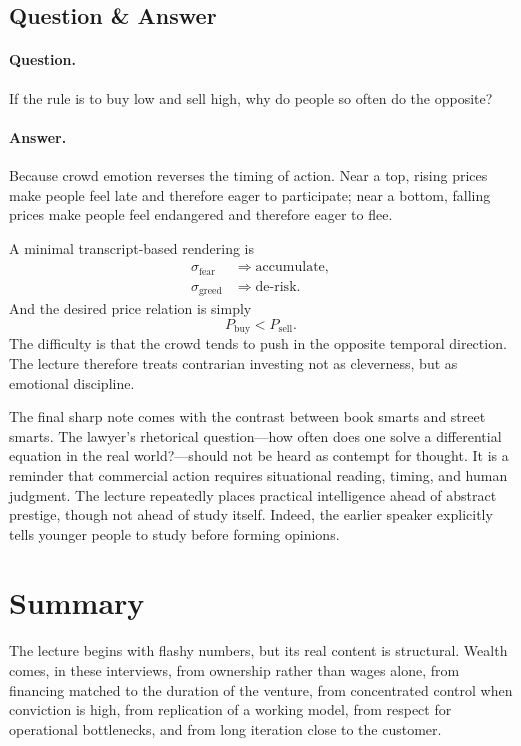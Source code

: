 \subsection{Question \& Answer}

\paragraph{Question.} If the rule is to buy low and sell high, why do people so often do the opposite?

\paragraph{Answer.} Because crowd emotion reverses the timing of action. Near a top, rising prices make people feel late and therefore eager to participate; near a bottom, falling prices make people feel endangered and therefore eager to flee.

A minimal transcript-based rendering is
\begin{align}
\sigma_{\mathrm{fear}} &\Rightarrow \text{accumulate},\\
\sigma_{\mathrm{greed}} &\Rightarrow \text{de-risk}.
\end{align}
And the desired price relation is simply
\begin{equation}
P_{\mathrm{buy}} < P_{\mathrm{sell}}.
\end{equation}
The difficulty is that the crowd tends to push in the opposite temporal direction. The lecture therefore treats contrarian investing not as cleverness, but as emotional discipline.

The final sharp note comes with the contrast between book smarts and street smarts. The lawyer's rhetorical question---how often does one solve a differential equation in the real world?---should not be heard as contempt for thought. It is a reminder that commercial action requires situational reading, timing, and human judgment. The lecture repeatedly places practical intelligence ahead of abstract prestige, though not ahead of study itself. Indeed, the earlier speaker explicitly tells younger people to study before forming opinions.

\section{Summary}

The lecture begins with flashy numbers, but its real content is structural. Wealth comes, in these interviews, from ownership rather than wages alone, from financing matched to the duration of the venture, from concentrated control when conviction is high, from replication of a working model, from respect for operational bottlenecks, and from long iteration close to the customer.

